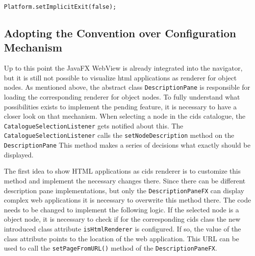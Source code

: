 \begin{lstlisting}[label=implicit_exit,caption=Disable JavaFX implicit exit]
Platform.setImplicitExit(false);
\end{lstlisting}

\subsection{Adopting the Convention over Configuration Mechanism}

Up to this point the JavaFX WebView is already integrated into the navigator, but it is still not possible to visualize html applications as renderer for object nodes.
As mentioned above, the abstract class \texttt{DescriptionPane} is responsible for loading the corresponding renderer for object nodes.
To fully understand what possibilities exists to implement the pending feature, it is necessary to have a closer look on that mechanism.
When selecting a node in the cids catalogue, the \texttt{CatalogueSelectionListener} gets notified about this.
The \texttt{CatalogueSelectionListener} calls the \texttt{setNodeDescription} method on the \texttt{DescriptionPane}
This method makes a series of decisions what exactly should be displayed.
 
The first idea to show HTML applications as cids renderer is to customize this method and implement the necessary changes there.
Since there can be different description pane implementations, but only the \texttt{DescriptionPaneFX} can display complex web applications it is necessary to overwrite this method there.
The code needs to be changed to implement the following logic.
If the selected node is a object node, it is necessary to check if for the corresponding cids class the new introduced class attribute \texttt{isHtmlRenderer} is configured.
If so, the value of the class attribute  points to the location of the web application.
This URL can be used to call the \texttt{setPageFromURL()} method of the \texttt{DescriptionPaneFX}.


